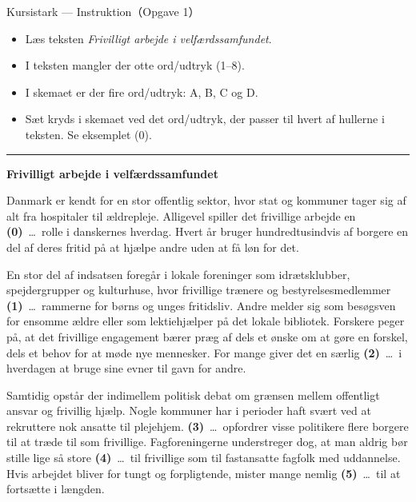 \begin{emailbox}{Kursistark --- Instruktion（Opgave 1）}
\begin{itemize}
  \item Læs teksten \textit{Frivilligt arbejde i velfærdssamfundet}.
  \item I teksten mangler der otte ord/udtryk (1--8).
  \item I skemaet er der fire ord/udtryk: A, B, C og D.
  \item Sæt kryds i skemaet ved det ord/udtryk, der passer til hvert af hullerne i teksten. Se eksemplet (0).
\end{itemize}

\vspace{0.35em}
\hrule
\vspace{0.45em}

\textbf{\color{NCDNavy}Frivilligt arbejde i velfærdssamfundet}

\vspace{0.3em}
Danmark er kendt for en stor offentlig sektor, hvor stat og kommuner tager sig af alt fra hospitaler til ældrepleje. Alligevel spiller det frivillige arbejde en \textbf{(0)}\ \ldots\ rolle i danskernes hverdag. Hvert år bruger hundredtusindvis af borgere en del af deres fritid på at hjælpe andre uden at få løn for det.

\vspace{0.25em}
En stor del af indsatsen foregår i lokale foreninger som idrætsklubber, spejdergrupper og kulturhuse, hvor frivillige trænere og bestyrelsesmedlemmer \textbf{(1)}\ \ldots\ rammerne for børns og unges fritidsliv. Andre melder sig som besøgsven for ensomme ældre eller som lektiehjælper på det lokale bibliotek. Forskere peger på, at det frivillige engagement bærer præg af dels et ønske om at gøre en forskel, dels et behov for at møde nye mennesker. For mange giver det en særlig \textbf{(2)}\ \ldots\ i hverdagen at bruge sine evner til gavn for andre.

\vspace{0.25em}
Samtidig opstår der indimellem politisk debat om grænsen mellem offentligt ansvar og frivillig hjælp. Nogle kommuner har i perioder haft svært ved at rekruttere nok ansatte til plejehjem. \textbf{(3)}\ \ldots\ opfordrer visse politikere flere borgere til at træde til som frivillige. Fagforeningerne understreger dog, at man aldrig bør stille lige så store \textbf{(4)}\ \ldots\ til frivillige som til fastansatte fagfolk med uddannelse. Hvis arbejdet bliver for tungt og forpligtende, mister mange nemlig \textbf{(5)}\ \ldots\ til at fortsætte i længden.


\end{emailbox}

